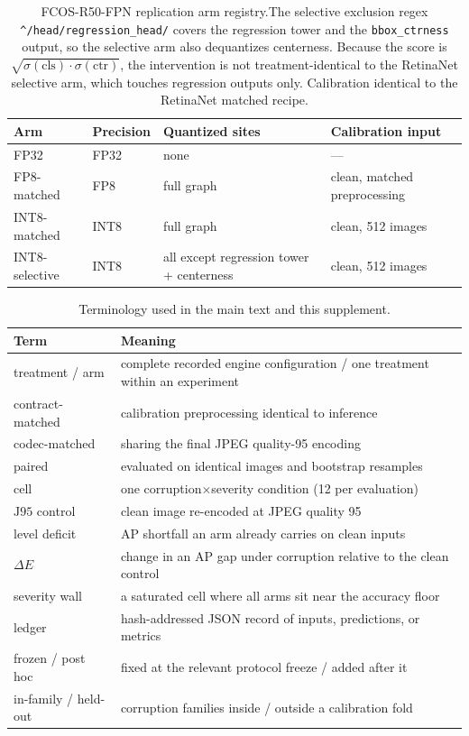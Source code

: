 \documentclass[10pt]{article}
\newcommand{\Jclean}{\mathrm{J95}}
\begin{document}
\begin{table}[h]
\centering\small
\caption{FCOS-R50-FPN replication arm registry.\label{tab:registry-fcos} The selective exclusion regex
\texttt{\^{}/head/regression\_head/} covers the regression tower and the
\texttt{bbox\_ctrness} output, so the selective arm also dequantizes
centerness. Because the score is $\sqrt{\sigma(\mathrm{cls})\cdot\sigma(\mathrm{ctr})}$,
the intervention is not treatment-identical to the RetinaNet selective arm,
which touches regression outputs only. Calibration identical to the RetinaNet matched
recipe.}
\begin{tabular}{@{}llll@{}}
\toprule
Arm & Precision & Quantized sites & Calibration input \\
\midrule
FP32 & FP32 & none & --- \\
FP8-matched & FP8 & full graph & clean, matched preprocessing \\
INT8-matched & INT8 & full graph & clean, 512 images \\
INT8-selective & INT8 & all except regression tower + centerness & clean, 512 images \\
\bottomrule
\end{tabular}
\end{table}

\begin{table}[h]
\centering\small
\caption{Terminology used in the main text and this supplement.}
\label{tab:glossary}
\begin{tabular}{@{}p{}p{}@{}}
\toprule
Term & Meaning \\
\midrule
treatment / arm & complete recorded engine configuration / one treatment within an experiment \\
contract-matched & calibration preprocessing identical to inference \\
codec-matched & sharing the final JPEG quality-95 encoding \\
paired & evaluated on identical images and bootstrap resamples \\
cell & one corruption$\times$severity condition (12 per evaluation) \\
$\Jclean$ control & clean image re-encoded at JPEG quality 95 \\
level deficit & AP shortfall an arm already carries on clean inputs \\
$\Delta E$ & change in an AP gap under corruption relative to the clean control \\
severity wall & a saturated cell where all arms sit near the accuracy floor \\
ledger & hash-addressed JSON record of inputs, predictions, or metrics \\
frozen / post hoc & fixed at the relevant protocol freeze / added after it \\
in-family / held-out & corruption families inside / outside a calibration fold \\
\bottomrule
\end{tabular}
\end{table}
\end{document}
